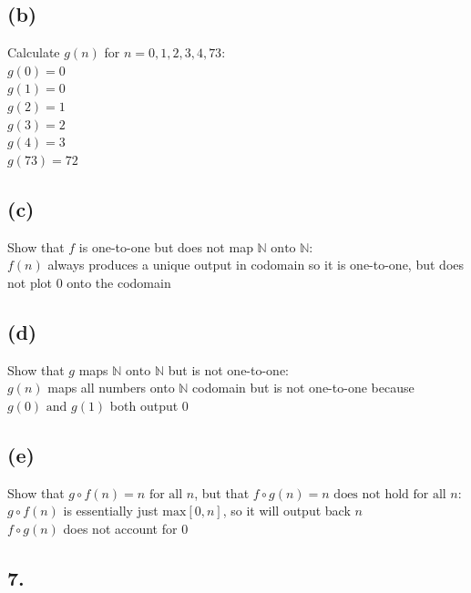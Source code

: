 \documentclass[11pt]{article}
\begin{document}
\subsection*{(b)}
\begin{center}
Calculate $g(n)$ for $n = 0,1,2,3,4,73$:\\
\hfill \break
$g(0) = 0$\\
$g(1) = 0$\\
$g(2) = 1$\\
$g(3) = 2$\\
$g(4) = 3$\\
$g(73) = 72$\\
\end{center}

\subsection*{(c)}
\begin{center}
Show that $f$ is one-to-one but does not map $\mathbb{N} \text{ onto } \mathbb{N}$:\\
\hfill \break
$f(n)$ always produces a unique output in codomain so it is one-to-one, but does not plot $0$ onto the codomain
\end{center}

\subsection*{(d)}
\begin{center}
Show that $g$ maps $\mathbb{N} \text{ onto } \mathbb{N}$ but is not one-to-one:\\
\hfill \break
$g(n)$ maps all numbers onto $\mathbb{N}$ codomain but is not one-to-one because $g(0) \text{ and } g(1)$ both output $0$
\end{center}

\subsection*{(e)}
\begin{center}
Show that $g \circ f(n) = n \text{ for all } n$, but that $f \circ g(n) = n \text{ does not hold for all } n$:\\
\hfill \break
$g \circ f(n)$ is essentially just $\text{max}[0,n]$, so it will output back $n$\\
$f \circ g(n)$ does not account for $0$
\end{center}
%
%
\subsection*{7.}
\begin{center}

\end{center}
\end{document}
